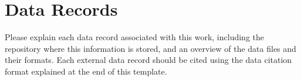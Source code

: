 \section{Data Records}

Please explain each data record associated with this work, including the repository where this information is stored, and an overview of the data files and their formats. Each external data record should be cited using the data citation format explained at the end of this template. 